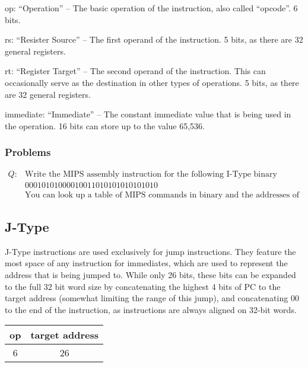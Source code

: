\documentclass{article}
\begin{document}
op: ``Operation'' -- The basic operation of the instruction, also called ``opcode''. 6 bits.

rs: ``Resister Source'' -- The first operand of the instruction. 5 bits, as there are 32 general registers. 

rt: ``Register Target'' -- The second operand of the instruction. This can occasionally serve as the destination in other types of operations. 5 bits, as there are 32 general registers. 

immediate: ``Immediate'' -- The constant immediate value that is being used in the operation. 16 bits can store up to the value 65,536.

\subsubsection{Problems}\label{ITypeProblems}

\begin{equation}\label{IType1}
\begin{aligned}
    Q: & \text{Write the MIPS assembly instruction for the following I-Type binary instruction:}\\
    & 00010101000010011010101010101010\\
    & \text{You can look up a table of MIPS commands in binary and the addresses of registers.}
\end{aligned}
\end{equation}


\subsection{J-Type}\label{JType}

J-Type instructions are used exclusively for jump instructions. They feature the most space of any instruction for immediates, which are used to represent the address that is being jumped to. While only 26 bits, these bits can be expanded to the full 32 bit word size by concatenating the highest 4 bits of PC to the target address (somewhat limiting the range of this jump), and concatenating 00 to the end of the instruction, as instructions are always aligned on 32-bit words. 

\begin{tabular}{| c | c |}
    \hline
        op & target address \\
        \hline
        6 & 26 \\
    \hline
\end{tabular}
\end{document}
